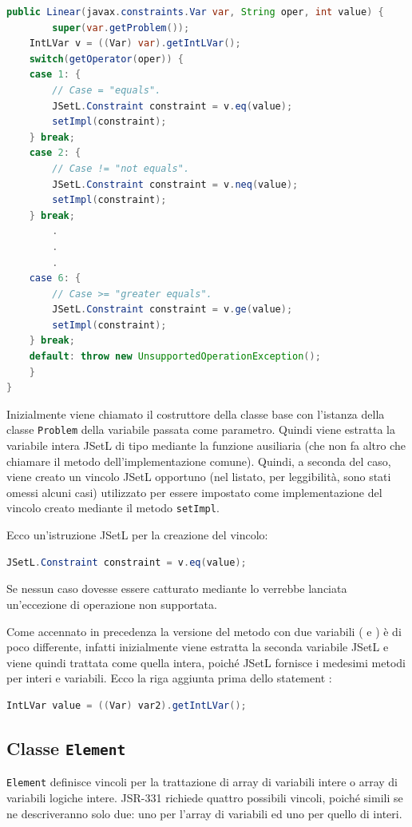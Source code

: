 \begin{lstlisting}[language = Java,
                   caption = {costruttore \files{Linear} 
                   con variabile e intero.}]
public Linear(javax.constraints.Var var, String oper, int value) {
        super(var.getProblem());
	IntLVar v = ((Var) var).getIntLVar();
	switch(getOperator(oper)) {
	case 1: {
		// Case = "equals".
		JSetL.Constraint constraint = v.eq(value);
		setImpl(constraint);
	} break;
	case 2: {
		// Case != "not equals".
		JSetL.Constraint constraint = v.neq(value);
		setImpl(constraint);
	} break;
        .
        .
        .
	case 6: {
		// Case >= "greater equals".
		JSetL.Constraint constraint = v.ge(value);
		setImpl(constraint);
	} break;
	default: throw new UnsupportedOperationException();
	}
}
\end{lstlisting}
Inizialmente viene chiamato il costruttore della classe base con l'istanza
della classe \texttt{Problem} della variabile passata come parametro.
Quindi viene estratta la variabile intera JSetL di tipo 
 mediante la funzione ausiliaria  (che non
fa altro che chiamare il metodo  dell'implementazione comune).
Quindi, a seconda del caso, viene creato un vincolo JSetL opportuno 
(nel listato, per leggibilità,
sono stati omessi alcuni casi) utilizzato per essere impostato come
implementazione del vincolo creato mediante il metodo \texttt{setImpl}.
\begin{flushleft}
Ecco un'istruzione JSetL per la creazione del vincolo:
\begin{lstlisting}[language = Java, frame = single]
JSetL.Constraint constraint = v.eq(value);
\end{lstlisting}
\end{flushleft}

Se nessun caso dovesse essere catturato mediante lo  
verrebbe lanciata un'eccezione di operazione non supportata.

Come accennato in precedenza la versione del metodo con due variabili
( e ) è di poco differente, infatti inizialmente
viene estratta la seconda variabile JSetL e viene quindi trattata come
quella intera, poiché JSetL fornisce i medesimi metodi per interi e variabili.
Ecco la riga aggiunta prima dello statement :
\begin{lstlisting}[language = Java, frame = single]
IntLVar value = ((Var) var2).getIntLVar();
\end{lstlisting}


\subsection{Classe \texttt{Element}}\label{Element}
\texttt{Element} definisce vincoli per la trattazione di array di variabili
intere o array di variabili logiche intere. JSR-331 richiede
quattro possibili vincoli, poiché simili se ne descriveranno solo due: uno per 
l'array di variabili ed uno per quello di interi.

